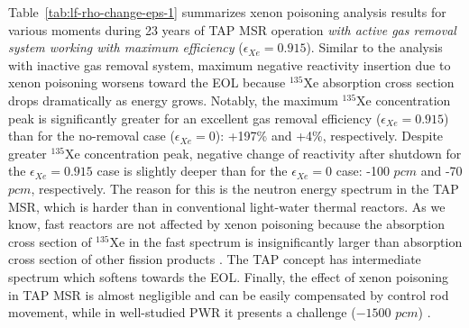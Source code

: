 Table~\ref{tab:lf-rho-change-eps-1}  summarizes xenon poisoning analysis 
results for various moments during 23 years of \gls{TAP} \gls{MSR} operation 
\emph{with active gas removal system working with maximum efficiency}
($\epsilon_{Xe}=0.915$). Similar to the analysis with inactive gas removal 
system, maximum negative reactivity insertion due to xenon poisoning worsens 
toward the \gls{EOL} because $^{135}$Xe absorption cross section drops 
dramatically as energy grows. Notably, 
the maximum $^{135}$Xe concentration peak is significantly greater for an 
excellent gas removal efficiency ($\epsilon_{Xe}=0.915$) than for the 
no-removal case ($\epsilon_{Xe}=0$): +197\% and +4\%, respectively. Despite 
greater $^{135}$Xe concentration peak, negative change of reactivity after 
shutdown for the $\epsilon_{Xe}=0.915$ case is slightly deeper than for the 
$\epsilon_{Xe}=0$ case: -100 $pcm$ and -70 $pcm$, respectively. The reason for 
this is the neutron energy spectrum in the \gls{TAP} \gls{MSR}, which is 
harder than in conventional light-water thermal reactors. As we know, 
fast reactors are not affected by xenon poisoning because the absorption cross 
section of $^{135}$Xe in the fast spectrum is insignificantly larger than 
absorption cross section of other fission products \cite{bell_nuclear_1970, 
svanstrom_load_2016-2}. The \gls{TAP} concept has intermediate spectrum which 
softens towards the \gls{EOL}. Finally, the effect of xenon 
poisoning in \gls{TAP} \gls{MSR} is almost negligible and can be easily 
compensated by control rod movement, while in well-studied \gls{PWR} it 
presents a challenge ($-1500$ $pcm$) \cite{rykhlevskii_impact_2019}.
